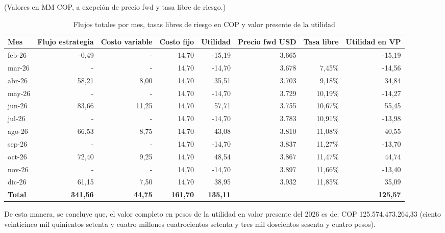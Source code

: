 \documentclass{article}
\theoremstyle{remark}
\theoremstyle{definition}
\begin{document}
\begin{table}[H]
\centering
\caption{Flujos totales por mes, tasas libres de riesgo en COP y valor presente de la utilidad}

(Valores en MM COP, a exepción de precio fwd y tasa libre de riesgo.)
\footnotesize
\renewcommand{\arraystretch}{1.2}

\begin{tabular}{l|rrrr|rr|r}
\hline
\textbf{Mes} & \textbf{Flujo estrategia} & \textbf{Costo variable} & \textbf{Costo fijo} & \textbf{Utilidad} & \textbf{Precio fwd USD} & \textbf{Tasa libre} & \textbf{Utilidad en VP\footnotemark} \\

\hline
feb-26 & -0,49 & - & 14,70 & -15,19 & 3.665 &  & -15,19 \\
mar-26 & - & - & 14,70 & -14,70 & 3.678 & 7,45\% & -14,56 \\
abr-26 & 58,21 & 8,00 & 14,70 & 35,51 & 3.703 & 9,18\% & 34,84 \\
may-26 & - & - & 14,70 & -14,70 & 3.729 & 10,19\% & -14,27 \\
jun-26 & 83,66 & 11,25 & 14,70 & 57,71 & 3.755 & 10,67\% & 55,45 \\
jul-26 & - & - & 14,70 & -14,70 & 3.783 & 10,91\% & -13,98 \\
ago-26 & 66,53 & 8,75 & 14,70 & 43,08 & 3.810 & 11,08\% & 40,55 \\
sep-26 & - & - & 14,70 & -14,70 & 3.837 & 11,27\% & -13,70 \\
oct-26 & 72,40 & 9,25 & 14,70 & 48,54 & 3.867 & 11,47\% & 44,74 \\
nov-26 & - & - & 14,70 & -14,70 & 3.897 & 11,66\% & -13,40 \\
dic-26 & 61,15 & 7,50 & 14,70 & 38,95 & 3.932 & 11,85\% & 35,09 \\
\hline
\textbf{Total} & \textbf{341,56} & \textbf{44,75} & \textbf{161,70} & \textbf{135,11} &  &  & \textbf{125,57} \\
\hline
\end{tabular}
\end{table}


De esta manera, se concluye que, el valor completo en pesos de la utilidad en valor presente del 2026 es de: COP 125.574.473.264,33 (ciento veinticinco mil quinientos setenta y cuatro millones cuatrocientos setenta y tres mil doscientos sesenta y cuatro pesos).
 
\end{document}
